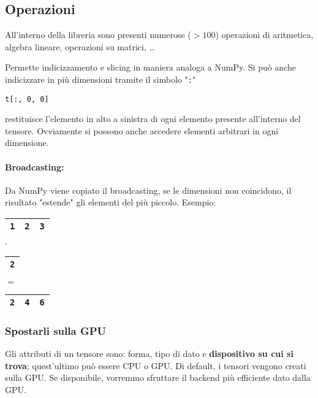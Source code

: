 \subsection{Operazioni}

All'interno della libreria sono presenti numerose ($> 100$) operazioni di aritmetica, algebra lineare, operazioni su matrici, \dots

Permette indicizzamento e slicing in maniera analoga a NumPy. Si può anche indicizzare in più dimensioni tramite il simbolo "\texttt{:}"
\begin{verbatim}
t[:, 0, 0]
\end{verbatim}
restituisce l'elemento in alto a sinistra di ogni elemento presente all'interno del tensore. Ovviamente si possono anche accedere elementi arbitrari in ogni dimensione.

\paragraph{Broadcasting:} Da NumPy viene copiato il broadcasting, se le dimensioni non coincidono, il risultato "estende" gli elementi del più piccolo. Esempio:
\begin{center}
    \begin{tabular}{| c | c | c |}
        \hline 
        \texttt{1} & \texttt{2} & \texttt{3} \\
        \hline
    \end{tabular}
    $\cdot$
    \begin{tabular}{| c |}
        \hline
        \texttt{2} \\
        \hline 
    \end{tabular}
    $=$ 
    \begin{tabular}{| c | c | c |}
        \hline
        \texttt{2} & \texttt{4} & \texttt{6} \\
        \hline
    \end{tabular}
\end{center}

\subsubsection{Spostarli sulla GPU}

Gli attributi di un tensore sono: forma, tipo di dato e \textbf{dispositivo su cui si trova}; quest'ultimo può essere CPU o GPU. Di default, i tensori vengono creati sulla GPU. Se disponibile, vorremmo sfruttare il backend più efficiente dato dalla GPU. 

